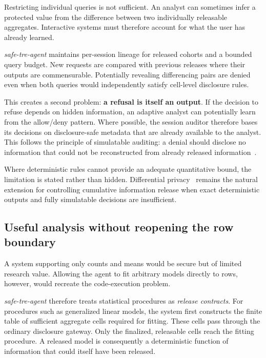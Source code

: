 \documentclass[11pt,a4paper]{article}
\begin{document}
Restricting individual queries is not sufficient. An analyst can sometimes infer
a protected value from the difference between two individually releasable
aggregates. Interactive systems must therefore account for what the user has
already learned.

\textit{safe-tre-agent} maintains per-session lineage for released cohorts and
a bounded query budget. New requests are compared with previous releases where
their outputs are commensurable. Potentially revealing differencing pairs are
denied even when both queries would independently satisfy cell-level disclosure
rules.

This creates a second problem: \textbf{a refusal is itself an output}. If the
decision to refuse depends on hidden information, an adaptive analyst can
potentially learn from the allow/deny pattern. Where possible, the session
auditor therefore bases its decisions on disclosure-safe metadata that are
already available to the analyst. This follows the principle of simulatable
auditing: a denial should disclose no information that could not be
reconstructed from already released information~\cite{kenthapadi2005}.

Where deterministic rules cannot provide an adequate quantitative bound, the
limitation is stated rather than hidden. Differential privacy~\cite{dwork2006}
remains the natural extension for controlling cumulative information release
when exact deterministic outputs and fully simulatable decisions are
insufficient.

\subsection{Useful analysis without reopening the row boundary}
\label{sec:cells-intro}

A system supporting only counts and means would be secure but of limited
research value. Allowing the agent to fit arbitrary models directly to rows,
however, would recreate the code-execution problem.

\textit{safe-tre-agent} therefore treats statistical procedures as
\emph{release contracts}. For procedures such as generalized linear models, the
system first constructs the finite table of sufficient aggregate cells required
for fitting. These cells pass through the ordinary disclosure gateway. Only the
finalized, releasable cells reach the fitting procedure. A released model is
consequently a deterministic function of information that could itself have
been released.
\end{document}
